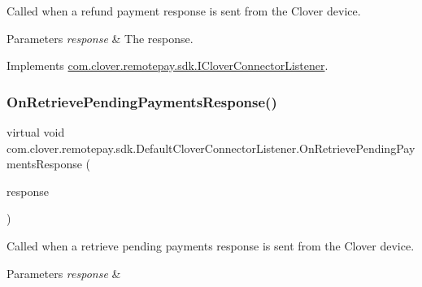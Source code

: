 Called when a refund payment response is sent from the Clover device. 


\begin{DoxyParams}{Parameters}
{\em response} & The response.\\
\hline
\end{DoxyParams}


Implements \hyperlink{interfacecom_1_1clover_1_1remotepay_1_1sdk_1_1_i_clover_connector_listener_a587ba1b1dfd1201e9225c7bc6323ad45}{com.\+clover.\+remotepay.\+sdk.\+I\+Clover\+Connector\+Listener}.

\mbox{\label{classcom_1_1clover_1_1remotepay_1_1sdk_1_1_default_clover_connector_listener_afb505c42e77209a31ce61911641f40cf}} 
\subsubsection{\texorpdfstring{On\+Retrieve\+Pending\+Payments\+Response()}{OnRetrievePendingPaymentsResponse()}}
{\footnotesize\ttfamily virtual void com.\+clover.\+remotepay.\+sdk.\+Default\+Clover\+Connector\+Listener.\+On\+Retrieve\+Pending\+Payments\+Response (\begin{DoxyParamCaption}\item[{\hyperlink{classcom_1_1clover_1_1remotepay_1_1sdk_1_1_retrieve_pending_payments_response}{Retrieve\+Pending\+Payments\+Response}}]{response }\end{DoxyParamCaption})\hspace{0.3cm}{\ttfamily [virtual]}}



Called when a retrieve pending payments response is sent from the Clover device. 


\begin{DoxyParams}{Parameters}
{\em response} & \\
\hline
\end{DoxyParams}


